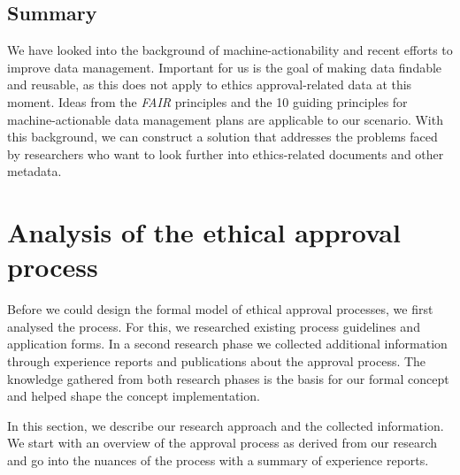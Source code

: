 \documentclass[10pt]{article}
\begin{document}
\subsection{Summary}
We have looked into the background of machine-actionability and recent efforts to improve data management. Important for us is the goal of making data findable and reusable, as this does not apply to ethics approval-related data at this moment. Ideas from the \textit{FAIR} principles and the 10 guiding principles for machine-actionable data management plans are applicable to our scenario. With this background, we can construct a solution that addresses the problems faced by researchers who want to look further into ethics-related documents and other metadata.

\newpage

\section{Analysis of the ethical approval process}
\label{sec:analysis}
Before we could design the formal model of ethical approval processes, we first analysed the process. For this, we researched existing process guidelines and application forms. In a second research phase we collected additional information through experience reports and publications about the approval process. The knowledge gathered from both research phases is the basis for our formal concept and helped shape the concept implementation.

In this section, we describe our research approach and the collected information. We start with an overview of the approval process as derived from our research and go into the nuances of the process with a summary of experience reports.
\end{document}
